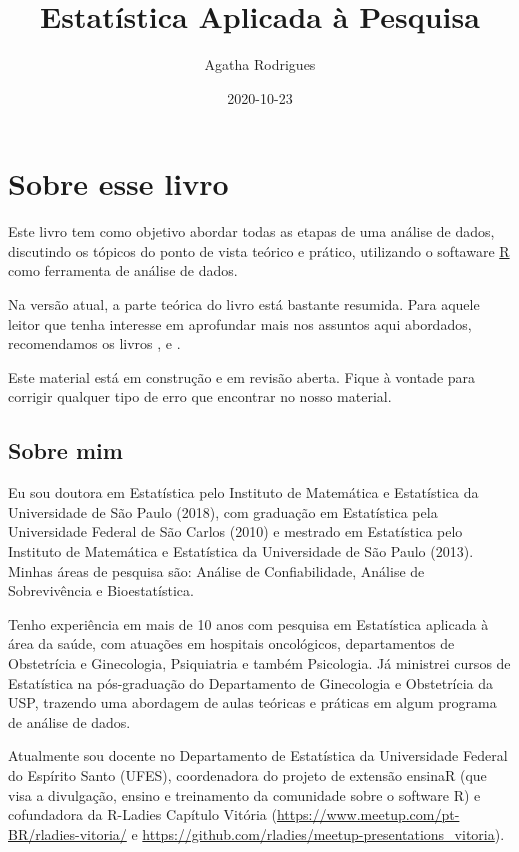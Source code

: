 \documentclass[
]{book}
\title{Estatística Aplicada à Pesquisa}
\author{Agatha Rodrigues}
\date{2020-10-23}
\begin{document}
\maketitle

{
\setcounter{tocdepth}{1}
\tableofcontents
}
\hypertarget{sobre-esse-livro}{%
\chapter{Sobre esse livro}\label{sobre-esse-livro}}

Este livro tem como objetivo abordar todas as etapas de uma análise de dados, discutindo os tópicos do ponto de vista teórico e prático, utilizando o softaware \href{https://cran.r-project.org/}{R} como ferramenta de análise de dados.

Na versão atual, a parte teórica do livro está bastante resumida. Para aquele leitor que tenha interesse em aprofundar mais nos assuntos aqui abordados, recomendamos os livros \citep{morettin2020introduccaoa}, \citep{bussab2004estatistica} e \citep{magalhaes2002noccoes}.

Este material está em construção e em revisão aberta. Fique à vontade para corrigir qualquer tipo de erro que encontrar no nosso material.

\hypertarget{sobre-mim}{%
\section{Sobre mim}\label{sobre-mim}}

Eu sou doutora em Estatística pelo Instituto de Matemática e Estatística da Universidade de São Paulo (2018), com graduação em Estatística pela Universidade Federal de São Carlos (2010) e mestrado em Estatística pelo Instituto de Matemática e Estatística da Universidade de São Paulo (2013). Minhas áreas de pesquisa são: Análise de Confiabilidade, Análise de Sobrevivência e Bioestatística.

Tenho experiência em mais de 10 anos com pesquisa em Estatística aplicada à área da saúde, com atuações em hospitais oncológicos, departamentos de Obstetrícia e Ginecologia, Psiquiatria e também Psicologia. Já ministrei cursos de Estatística na pós-graduação do Departamento de Ginecologia e Obstetrícia da USP, trazendo uma abordagem de aulas teóricas e práticas em algum programa de análise de dados.

Atualmente sou docente no Departamento de Estatística da Universidade Federal do Espírito Santo (UFES), coordenadora do projeto de extensão ensinaR (que visa a divulgação, ensino e treinamento da comunidade sobre o software R) e cofundadora da R-Ladies Capítulo Vitória (\url{https://www.meetup.com/pt-BR/rladies-vitoria/} e \url{https://github.com/rladies/meetup-presentations_vitoria}).
\end{document}
